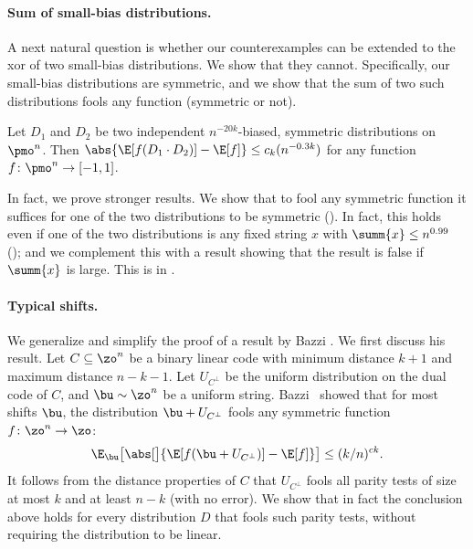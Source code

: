 \paragraph{Sum of small-bias distributions.}
%
A next natural question is whether our counterexamples can be extended to the xor of two small-bias distributions.  We show that they cannot.  Specifically, our small-bias distributions are symmetric, and we show that the sum of two such distributions fools any function (symmetric or not).

\begin{theorem} \label{thm:sym-xor-sym-fools-any}
Let $D_1$ and $D_2$ be two independent $n^{-20k}$-biased, symmetric distributions on $\pmo^n$.
Then $\abs{\E[f(D_1 \cdot D_2)] - \E[f]} \le c_k(n^{-0.3k})$ for any function $f\colon\pmo^n \to [-1,1]$.
\end{theorem}

In fact, we prove stronger results. We show that to fool any symmetric function it suffices for one of the two distributions to be symmetric ().  In fact, this holds even if one of the two distributions is any fixed string $x$ with $\summ{x} \le n^{0.99}$ (); and we complement this with a result showing that the result is false if $\summ{x}$ is large.
This is in .

\paragraph{Typical shifts.}
We generalize and simplify the proof of a result by Bazzi \cite{Bazzi15}.  We first discuss his result.  Let $C \subseteq \zo^n$ be a binary linear code with minimum distance $k+1$ and maximum distance $n-k-1$.
Let $U_{C^\perp}$ be the uniform distribution on the dual code of $C$, and $\bu \sim \zo^n$ be a uniform string.
Bazzi~\cite{Bazzi15} showed that for most shifts $\bu$, the distribution $\bu + U_{C^\perp}$ fools any symmetric function $f\colon\zo^n \to \zo$:
\[
  \E_{\bu}\bigl[ \abs[\big]{ \E[f(\bu + U_{C^\perp})] - \E[f] } \bigr] \le (k/n)^{ck} .
\]
It follows from the distance properties of $C$ that $U_{C^\perp}$ fools all parity tests of size at most $k$ and at least $n-k$ (with no error).  We show that in fact the conclusion above holds for every distribution $D$ that fools such parity tests, without requiring the distribution to be linear.

